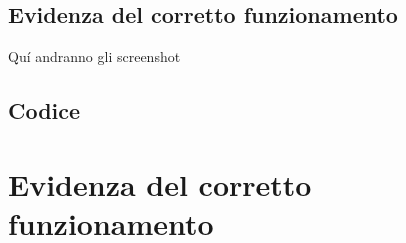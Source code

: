 \documentclass[a4paper]{article}
\begin{document}
\subsection{Evidenza del corretto funzionamento}
Qu\'i andranno gli screenshot
\subsection{Codice}








\section{Evidenza del corretto funzionamento}
\end{document}
